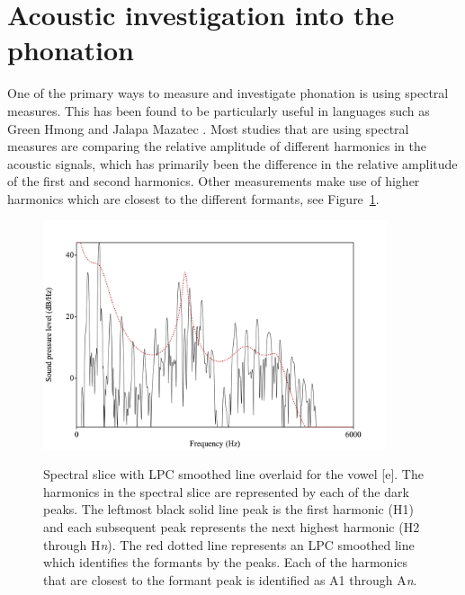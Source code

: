 \documentclass[12pt, letterpaper]{article}
\begin{document}
\section{Acoustic investigation into the phonation} \label{sec:Acoustics}

One of the primary ways to measure and investigate phonation is using spectral measures. This has been found to be particularly useful in languages such as Green Hmong \citep{huffmanMeasuresPhonationType1987,andruskiPhonationTypesProduction2000} and Jalapa Mazatec \citep{silvermanPhoneticStructuresJalapa1995,blankenshipTimeCourseBreathiness1997}. Most studies that are using spectral measures are comparing the relative amplitude of different harmonics in the acoustic signals, which has primarily been the difference in the relative amplitude of the first and second harmonics. Other measurements make use of higher harmonics which are closest to the different formants, see Figure~\ref{fig:Harmonics}. 
\begin{figure}[!h]
	\centering
	\includegraphics[width=0.9\textwidth]{../Harmonics.png}
	\label{fig:Harmonics}
	\caption{Spectral slice with LPC smoothed line overlaid for the vowel [e]. The harmonics in the spectral slice are represented by each of the dark peaks. The leftmost black solid line peak is the first harmonic (H1) and each subsequent peak represents the next highest harmonic (H2 through H\textit{n}). The red dotted line represents an LPC smoothed line which identifies the formants by the peaks. Each of the harmonics that are closest to the formant peak is identified as A1 through A\textit{n}.}
\end{figure}
\end{document}
